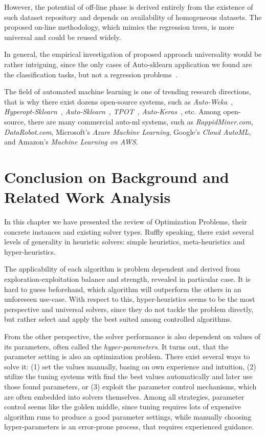 However, the potential of off-line phase is derived entirely from the existence of such dataset repository and depends on availability of homogeneous datasets. The proposed on-line methodology, which mimics the regression trees, is more universal and could be reused widely.

In general, the empirical investigation of proposed approach universality would be rather intriguing, since the only cases of Auto-sklearn application we found are the classification tasks, but not a regression problems~\cite{feurer2015efficient,biedenkapp-ecai20}.


The field of automated machine learning is one of trending research directions, that is why there exist dozens open-source systems, such as \textit{Auto-Weka}~\cite{thornton2013auto}, \textit{Hyperopt-Sklearn}~\cite{komer2014hyperopt}, \textit{Auto-Sklearn}~\cite{feurer2015efficient}, \textit{TPOT}~\cite{olson2019tpot}, \textit{Auto-Keras}~\cite{jin2019auto}, etc. Among open-source, there are many commercial auto-ml systems, such as \textit{RappidMiner.com}, \textit{DataRobot.com}, Microsoft’s \textit{Azure Machine Learning}, Google’s \textit{Cloud AutoML}, and Amazon's \textit{Machine Learning on AWS}.


\section{Conclusion on Background and Related Work Analysis}\label{bg: conclusion}
In this chapter we have presented the review of Optimization Problems, their concrete instances and existing solver types.
Ruffly speaking, there exist several levels of generality in heuristic solvers: simple heuristics, meta-heuristics and hyper-heuristics.

The applicability of each algorithm is problem dependent and derived from exploration-exploitation balance and strength, revealed in particular case.
It is hard to guess beforehand, which algorithm will outperform the others in an unforeseen use-case.
With respect to this, hyper-heuristics seems to be the most perspective and universal solvers, since they do not tackle the problem directly, but rather select and apply the best suited among controlled algorithms.

From the other perspective, the solver performance is also dependent on values of its parameters, often called the \textit{hyper-parameters}.
It turns out, that the parameter setting is also an optimization problem.
There exist several ways to solve it: (1) set the values manually, basing on own experience and intuition, (2) utilize the tuning systems with find the best values automatically and later use those found parameters, or (3) exploit the parameter control mechanisms, which are often embedded into solvers themselves. 
Among all strategies, parameter control seems like the golden middle, since tuning requires lots of expensive algorithm runs to produce a good parameter settings, while manually choosing hyper-parameters is an error-prone process, that requires experienced guidance.

